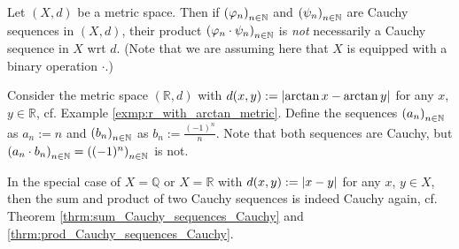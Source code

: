 \begin{remark}
	Let $(X, d)$ be a metric space. Then if $\seq[\varphi_n]$ and $\seq[\psi_n]$ are Cauchy sequences in $(X, d)$, their product $\seq[\varphi_n \cdot \psi_n]$ is \textit{not} necessarily a Cauchy sequence in $X$ wrt $d$. (Note that we are assuming here that $X$ is equipped with a binary operation $\cdot$.)
\end{remark}

\begin{exmp}\label{exmp:counter_exmp_prod_Cauchy_not_Cauchy}
	Consider the metric space $(\mathbb R, d)$ with $d(x, y) := \abs{\arctan x - \arctan y}$ for any $x$, $y\in\mathbb R$, cf. Example \ref{exmp:r_with_arctan_metric}. Define the sequences $\seq[a_n]$ as $a_n := n$ and $\seq[b_n]$ as $b_n := \frac{(-1)^n}{n}$. Note that both sequences are Cauchy, but $\seq[a_n \cdot b_n] = \seq[(-1)^n]$ is not.
\end{exmp}

\begin{remark}
	In the special case of $X = \mathbb Q$ or $X = \mathbb R$ with $d(x, y) := \abs{x - y}$ for any $x$, $y\in X$, then the sum and product of two Cauchy sequences is indeed Cauchy again, cf. Theorem \ref{thrm:sum_Cauchy_sequences_Cauchy} and \ref{thrm:prod_Cauchy_sequences_Cauchy}.
\end{remark}

